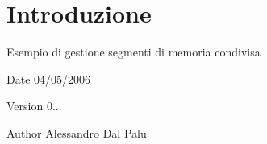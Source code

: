\hypertarget{index_intro}{}\section{Introduzione}\label{index_intro}
Esempio di gestione segmenti di memoria condivisa~\newline
 \begin{DoxyDate}{Date}
04/05/2006 
\end{DoxyDate}
\begin{DoxyVersion}{Version}
0... 
\end{DoxyVersion}
\begin{DoxyAuthor}{Author}
Alessandro Dal Palu 
\end{DoxyAuthor}
